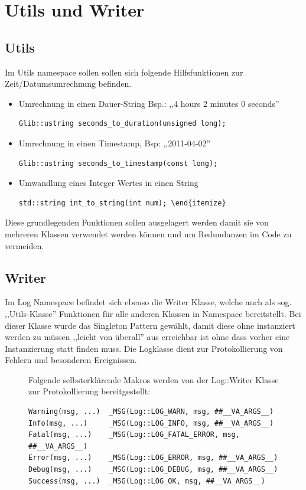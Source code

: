 
\section{Utils und Writer} 

\subsection{Utils}
Im Utils namespace sollen sollen sich folgende Hilfsfunktionen zur Zeit/Datumsumrechnung befinden.

\begin{itemize}
\item Umrechnung in einen Dauer-String Bsp.: ,,4 hours 2 minutes 0 seconds''

\begin{verbatim}
Glib::ustring seconds_to_duration(unsigned long);
\end{verbatim}

\item Umrechnung in einen Timestamp, Bsp: ,,2011-04-02''
\begin{verbatim}
Glib::ustring seconds_to_timestamp(const long);
\end{verbatim}

\item Umwandlung eines Integer Wertes in einen String
\begin{verbatim}
std::string int_to_string(int num); \end{itemize}
\end{verbatim}

\end{itemize}


Diese grundlegenden Funktionen sollen ausgelagert werden damit sie von mehreren Klassen verwendet werden können und um Redundanzen im 
Code zu vermeiden.

\subsection{Writer}

Im Log Namespace befindet sich ebenso die Writer Klasse, welche auch als sog. ,,Utils-Klasse'' Funktionen für alle anderen
Klassen in Namespace bereitstellt. Bei dieser Klasse wurde das Singleton Pattern gewählt, damit diese ohne instanziert werden
zu müssen ,,leicht von überall'' aus erreichbar ist ohne dass vorher eine Instanzierung statt finden muss.
Die Logklasse dient zur Protokollierung von Fehlern und besonderen Ereignissen.  

\begin{figure}[htb!]
Folgende selbsterklärende Makros werden von der Log::Writer Klasse zur Protokollierung bereitgestellt:

\begin{verbatim}
Warning(msg, ...)  _MSG(Log::LOG_WARN, msg, ##__VA_ARGS__)
Info(msg, ...)     _MSG(Log::LOG_INFO, msg, ##__VA_ARGS__)
Fatal(msg, ...)    _MSG(Log::LOG_FATAL_ERROR, msg, ##__VA_ARGS__)
Error(msg, ...)    _MSG(Log::LOG_ERROR, msg, ##__VA_ARGS__)
Debug(msg, ...)    _MSG(Log::LOG_DEBUG, msg, ##__VA_ARGS__)
Success(msg, ...)  _MSG(Log::LOG_OK, msg, ##__VA_ARGS__)
\end{verbatim}
\end{figure}

